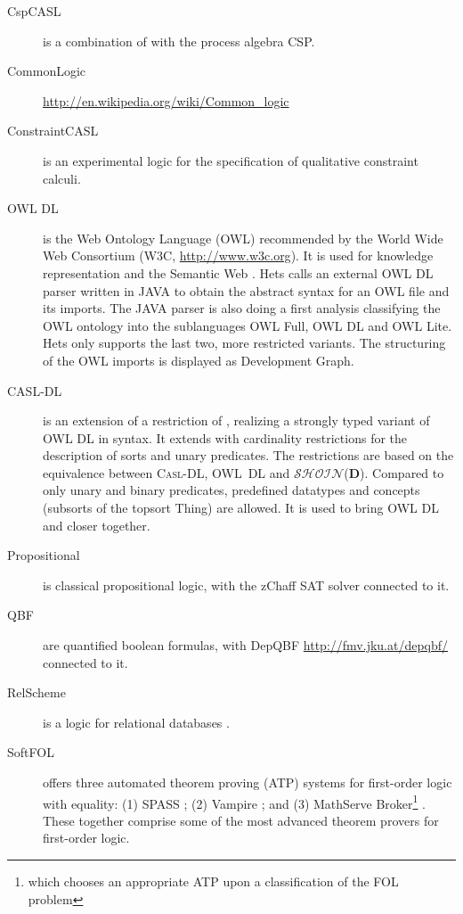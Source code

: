 \documentclass{article}
\newcommand{\normalTEXTSC}[2]{{#1\scriptsize#2}}
\newcommand     {\SPASS}{\normalTEXTSC{S}{PASS}\xspace}
\newcommand{\CASLDL}{\textmd{\textsc{Casl-DL}}\xspace}
\newcommand{\SHOIN}{$\mathcal{SHOIN}$(\textbf{D})\xspace}
\newcommand{\Csp}{\normalTEXTSC{C}{SP}\xspace}
\begin{document}
\begin{description}
\item[CspCASL] \cite{Roggenbach06} is a combination of \CASL
  with the process algebra \Csp.

\item[CommonLogic] \url{http://en.wikipedia.org/wiki/Common_logic}

\item[ConstraintCASL] is an experimental logic for the specification
of qualitative constraint calculi.

\item[OWL DL] is the Web Ontology Language (OWL) recommended by the
  World Wide Web Consortium (W3C, \url{http://www.w3c.org}). It is
  used for knowledge representation and the Semantic Web
  \cite{berners:2001:SWeb}.
Hets calls an external OWL DL parser
  written in JAVA to obtain the abstract syntax for an OWL file and its
  imports. The JAVA parser is also doing a first analysis classifying
  the OWL ontology into the sublanguages OWL Full, OWL DL and OWL
  Lite.
 Hets only supports the last two, more restricted variants.
The
  structuring of the OWL imports is displayed as Development Graph.

\item[CASL-DL] \cite{OWL-CASL-WADT2004}
is an extension of a restriction of \CASL, realizing
a strongly typed variant of OWL DL in \CASL syntax.
It extends
  \CASL with cardinality restrictions for the description of sorts and
  unary predicates. The restrictions are based on the equivalence
  between \CASLDL, OWL~DL and \SHOIN. Compared to \CASL only unary
  and binary predicates, predefined datatypes and concepts (subsorts
  of the topsort Thing) are allowed. It is used to bring OWL DL and
  \CASL closer together.

\item[Propositional] is classical propositional logic, with
the zChaff SAT solver \cite{Herbstritt03} connected to it.

\item[QBF] are quantified boolean formulas, with
DepQBF \url{http://fmv.jku.at/depqbf/} connected to it.

\item[RelScheme] is a logic for relational databases \cite{DBLP:journals/ao/SchorlemmerK08}.

\item[SoftFOL] \cite{LuettichEA06a} offers three automated theorem
  proving (ATP) systems for first-order logic with equality: (1) \SPASS
  \cite{WeidenbachEtAl02}; (2) Vampire \cite{RiazanovV02}; and (3)
  MathServe Broker\footnote{which chooses an appropriate ATP upon a
    classification of the FOL problem} \cite{ZimmerAutexier06}.
  These together comprise some of the most advanced theorem provers
  for first-order logic.


\end{description}
\end{document}
